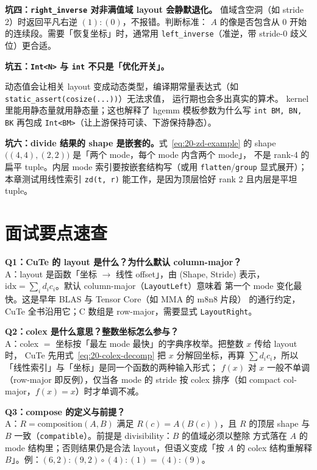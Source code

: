 \textbf{坑四：\texttt{right\_\allowbreak{}inverse} 对非满值域 layout 会静默退化。}
值域含空洞（如 stride 2）时返回平凡右逆 $(1){:}(0)$，不报错。判断标准：
$A$ 的像是否包含从 0 开始的连续段。需要「恢复坐标」时，通常用
\texttt{left\_\allowbreak{}inverse}（准逆，带 stride-0 歧义位）更合适。

\textbf{坑五：\texttt{Int<N>} 与 \texttt{int} 不只是「优化开关」。}
\begin{sloppypar}
动态值会让相关 layout 变成动态类型，编译期常量表达式（如
\texttt{static\_\allowbreak{}assert}\allowbreak\texttt{\allowbreak{}(cosize\allowbreak{}(.\allowbreak{}.\allowbreak{}.\allowbreak{}))}）无法求值，
运行期也会多出真实的算术。
kernel 里能用静态量就用静态量；这也解释了 hgemm 模板参数为什么写
\texttt{int BM, BN, BK} 再包成 \texttt{Int<BM>}（让上游保持可读、下游保持静态）。
\end{sloppypar}

\textbf{坑六：divide 结果的 shape 是嵌套的。}式~\eqref{eq:20-zd-example} 的
shape $\bigl((4,4),(2,2)\bigr)$ 是「两个 mode，每个 mode 内含两个 mode」，
不是 rank-4 的扁平 tuple。内层 mode 索引要按嵌套结构写（或用
\texttt{flatten}/\texttt{group} 显式展开）；本章测试用线性索引
\texttt{zd(t, r)} 能工作，是因为顶层恰好 rank 2 且内层是平坦 tuple。

\section{面试要点速查}

\textbf{Q1：CuTe 的 layout 是什么？为什么默认 column-major？}\\
A：layout 是函数「坐标 $\to$ 线性 offset」，由 (Shape, Stride) 表示，
$\mathrm{idx}=\sum_i d_i c_i$。默认 column-major（\texttt{LayoutLeft}）意味着
第一个 mode 变化最快。这是早年 BLAS 与 Tensor Core（如 MMA 的 m8n8 片段）
的通行约定，CuTe 全书沿用它；C 数组是 row-major，需要显式
\texttt{LayoutRight}。

\textbf{Q2：colex 是什么意思？整数坐标怎么参与？}\\
A：colex $=$ 坐标按「最左 mode 最快」的字典序枚举。把整数 $x$ 传给 layout 时，
CuTe 先用式~\eqref{eq:20-colex-decomp} 把 $x$ 分解回坐标，再算
$\sum d_i c_i$，所以「线性索引」与「坐标」是同一个函数的两种输入形式；
$f(x)$ 对 $x$ 一般不单调（row-major 即反例），仅当各 mode 的 stride 按
colex 排序（如 compact col-major，$f(x)=x$）时才单调不减。

\textbf{Q3：compose 的定义与前提？}\\
A：$R=\mathrm{composition}(A,B)$ 满足 $R(c)=A(B(c))$，且 $R$ 的顶层 shape 与
$B$ 一致（\texttt{compatible}）。前提是 divisibility：$B$ 的值域必须以整除
方式落在 $A$ 的 mode 结构里；否则结果仍是合法 layout，但语义变成「按 $A$ 的
colex 结构重解释 $B$」。例：$(6,2){:}(9,2)\circ(4){:}(1)=(4){:}(9)$。

